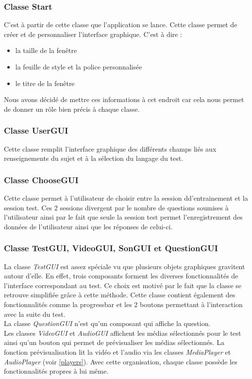 \subsubsection{Classe Start}

C'est à partir de cette classe que l'application se lance.
Cette classe permet de créer et de personnaliser l'interface graphique. C'est à dire :
\begin{itemize}
 \item la taille de la fenêtre
 \item la feuille de style et la police personnalisée
 \item le titre de la fenêtre
\end{itemize}
Nous avons décidé de mettre ces informations à cet endroit car cela nous permet de donner un rôle bien précis à chaque classe.

\subsubsection{Classe UserGUI}

Cette classe remplit l'interface graphique des différents champs liés aux renseignements du sujet et à la sélection du langage du test. 

\subsubsection{Classe ChooseGUI}

Cette classe permet à l'utilisateur de choisir entre la session dd'entrainement et la session test. Ces 2 sessions divergent par le nombre de questions soumises à l'utilisateur ainsi par le fait que seule la session test permet l'enregistrement des données de l'utilisateur ainsi que les réponses de celui-ci.

\subsubsection{Classe TestGUI, VideoGUI, SonGUI et QuestionGUI}

La classe \textit{TestGUI} est assez spéciale vu que plusieurs objets graphiques gravitent autour d'elle. En effet, trois composants forment les diverses fonctionnalités de l'interface correspondant au test. Ce choix est motivé par le fait que la classe se retrouve simplifiée grâce à cette méthode. Cette classe contient également des fonctionnalités comme la progressbar et les 2 boutons permettant à l'interaction avec la suite du test.\\
La classe \textit{QuestionGUI} n'est qu'un composant qui affiche la question.\\
Les classes \textit{VideoGUI} et \textit{AudioGUI} affichent les médias sélectionnés pour le test ainsi qu'un bouton qui permet de prévisualiser les médias sélectionnés. La fonction prévisualisation lit la vidéo et l'audio via les classes \textit{MediaPlayer} et \textit{AudioPlayer} (voir \ref{players}).
Avec cette organisation, chaque classe possède les fonctionnalités propres à lui même.

